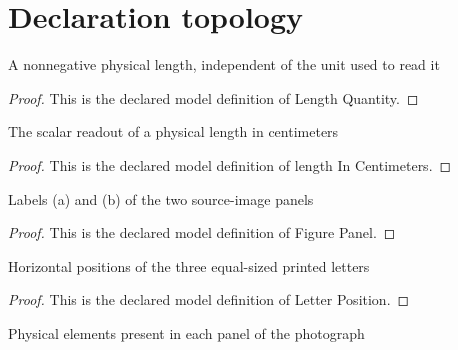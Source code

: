 \section{Declaration topology}
\begin{definition}
  \label{def:physics:phyx-mini-0149:phyxminiproblems-problemphyxmini0149-lengthquantity}
  A nonnegative physical length, independent of the unit used to read it
\end{definition}
\begin{proof}
  This is the declared model definition of Length Quantity.
\end{proof}
\begin{definition}
  \label{def:physics:phyx-mini-0149:phyxminiproblems-problemphyxmini0149-lengthincentimeters}
  The scalar readout of a physical length in centimeters
\end{definition}
\begin{proof}
  This is the declared model definition of length In Centimeters.
\end{proof}
\begin{definition}
  \label{def:physics:phyx-mini-0149:phyxminiproblems-problemphyxmini0149-figurepanel}
  Labels (a) and (b) of the two source-image panels
\end{definition}
\begin{proof}
  This is the declared model definition of Figure Panel.
\end{proof}
\begin{definition}
  \label{def:physics:phyx-mini-0149:phyxminiproblems-problemphyxmini0149-letterposition}
  Horizontal positions of the three equal-sized printed letters
\end{definition}
\begin{proof}
  This is the declared model definition of Letter Position.
\end{proof}
\begin{definition}
  \label{def:physics:phyx-mini-0149:phyxminiproblems-problemphyxmini0149-figureelement}
  Physical elements present in each panel of the photograph
\end{definition}
